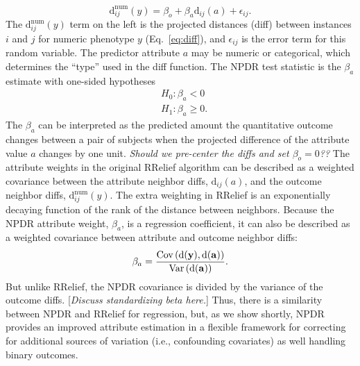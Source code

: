 \documentclass[10pt]{article}
\begin{document}
%
%
\begin{equation}\label{eq:lin_reg}
    \text{d}^{\text{num}}_{ij}(y) = \beta_{o} + \beta_{a} \text{d}_{ij}(a) + \epsilon_{ij}.
\end{equation}
The $\text{d}^{\text{num}}_{ij}(y)$ term on the left is the projected distances (diff) between instances $i$ and $j$ for numeric phenotype $y$ (Eq.~\ref{eq:diff}), and $\epsilon_{ij}$ is the error term for this random variable. The predictor attribute $a$ may be numeric or categorical, which determines the ``type'' used in the diff function. The NPDR test statistic is the $\beta_a$ estimate with one-sided hypotheses
\begin{equation}\label{eq:linreg_null}
\begin{aligned}
    & H_0: \beta_a < 0 \\
    & H_1: \beta_a \ge 0.
\end{aligned}
\end{equation}
The $\beta_a$ can be interpreted as the predicted amount the quantitative outcome changes between a pair of subjects when the projected difference of the attribute value $a$ changes by one unit. {\it Should we pre-center the diffs and set $\beta_o=0$??} The attribute weights in the original RRelief algorithm can be described as a weighted covariance between the attribute neighbor diffs, $\text{d}_{ij}(a)$, and the outcome neighbor diffs, $\text{d}^{\text{num}}_{ij}(y)$. The extra weighting in RRelief is an exponentially decaying function of the rank of the distance between neighbors. Because the NPDR attribute weight, $\beta_a$, is a regression coefficient, it can also be described as a weighted covariance between attribute and outcome neighbor diffs:
\begin{equation}
\beta_a = \frac{\text{Cov}\left( \bf{\text{d}}(\bf{y}), \bf{\text{d}}(\bf{a}) \right)} {\text{Var}\left( \bf{\text{d}}(\bf{a}) \right)}.
\end{equation}
But unlike RRelief, the NPDR covariance is divided by the variance of the outcome diffs. [\emph{Discuss standardizing beta here.}] Thus, there is a similarity between NPDR and RRelief for regression, but, as we show shortly, NPDR provides an improved attribute estimation in a flexible framework for correcting for additional sources of variation (i.e., confounding covariates) as well handling binary outcomes.   
\end{document}
